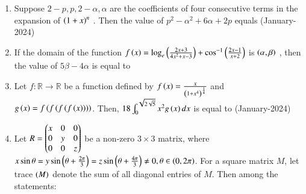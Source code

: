 \documentclass[journal]{IEEEtran}
\begin{document}
\begin{enumerate}
  \item Suppose $2-p, p, 2 - \alpha, \alpha$
 are the coefficients of four consecutive terms in the expansion of $\left(1 + x\right)^n$
. Then the value of $p^2 - \alpha^2 + 6\alpha + 2p$
 equals \hfill(January-2024)
 \begin{enumerate}
 \end{enumerate}
 \item If the domain of the function $f\left(x\right) = \log_e\left(\frac{2x +3}{4x^2 + x -3}\right) + \cos^{-1}\left(\frac{2x-1}{x+2}\right) $ is $\left(\alpha, \beta \right) $  , then the value of $5\beta - 4\alpha$
 is equal to
 \begin{enumerate}
 \end{enumerate}
 \item Let $f : \mathbb{R} \to \mathbb{R}$ be a function defined by $f\left(x\right) = \frac{x}{\left(1 + x^4\right) ^{\frac{1}{4}}}$ and $g\left(x\right) = f\left(f\left(f\left(f\left(x\right)\right)\right)\right)$. Then, $18 \int_0^{\sqrt{2\sqrt{5}}} x^2 g\left(x\right)dx$ is equal to \hfill(January-2024)
 \begin{enumerate}
 \end{enumerate}
 \item Let $R = \begin{pmatrix}x & 0 & 0 \\ 0 & y & 0 \\ 0 & 0 & z\end{pmatrix}$ be a non-zero $3 \times 3$ matrix, where $x\sin{\theta} = y \sin{\ensuremath{\left(\theta + \frac{2\pi}{3}\right)}} = z \sin{\ensuremath{\left(\theta + \frac{4\pi}{3}\right)}} \ne 0, \theta \in \left(0 , 2\pi\right)$. For a square matrix $M$, let trace $\left(M\right)$ denote the sum of all diagonal entries of $M$. Then among the statements: \\ \\

\end{enumerate}
\end{document}
